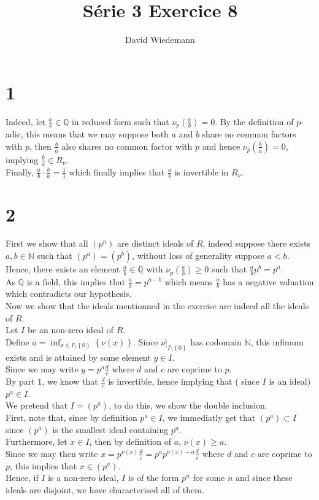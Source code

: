 \documentclass[11pt, a4paper]{article}
\begin{document}
\title{Série 3 Exercice 8}
\author{David Wiedemann}
\maketitle
\section*{1}
Indeed, let $\frac{a}{b}\in \mathbb{Q}$ in reduced form such that $\nu_p(\frac{a}{b} )=0 $. By the definition of $p$-adic, this means that we may suppose both $a$ and $b$ share no common factors with $p$, then $\frac{b}{a}$ also shares no common factor with $p$ and hence $\nu_p( \frac{b}{a}) =0$, implying $ \frac{b}{a}\in R_\nu$.\\
Finally, $\frac{a}{b}\cdot \frac{b}{a}= \frac{1}{1}$ which finally implies that $\frac{a}{b}$ is invertible in $R_\nu$.
\section*{2}
First we show that all $( p^{n}) $ are distinct ideals of $ R$, indeed suppose there exists $a,b \in \mathbb{N}$ such that $ ( p^{a}) = ( p^{b} )$, without loss of generality suppose $a<b$.\\
Hence, there exists an element $ \frac{a}{b} \in \mathbb{Q}$ with $ \nu_p( \frac{a}{b} ) \geq 0$ such that $ \frac{a}{b}p^{b} = p^{a} $.\\
As $ \mathbb{Q}$ is a field, this implies that $ \frac{a}{b}= p^{a-b}$ which means $ \frac{a}{b}$ has a negative valuation which contradicts our hypothesis.\\

Now we show that the ideals mentionned in the exercise are indeed all the ideals of $ R$.\\
Let $I$ be an non-zero ideal of $ R$.\\
Define $ a = \inf_{x \in I\setminus \left\{ 0 \right\} 	} \left\{ \nu( x)  \right\} $. Since $\nu\vert_{I \setminus \left\{ 0 \right\} }  $ has codomain $ \mathbb{N}$, this infimum exists and is attained by some element $y \in I$.\\
Since we may write $ y = p^{a} \frac{d}{c}$ where $d$ and $c$ are coprime to $p$.\\
By part $1$, we know that $\frac{d}{c}$ is invertible, hence implying that ( since $I$ is an ideal) $p^{a}\in I$.\\

We pretend that $ I = ( p^{a}) $, to do this, we show the double inclusion.\\
First, note that, since by definition $ p^{a}\in I$, we immediatly get that $ ( p^{a}) \subset I$ since $( p^{a}) $ is the smallest ideal containing $ p^{a}$.\\
Furthermore, let $x \in I$, then by definition of $a$, $\nu( x) \geq a$.\\
Since we may then write $x = p^{\nu( x) }\frac{d}{c} = p^{a} p^{\nu( x) -a}\frac{d}{c}$ where $d$ and $c$ are coprime to $p$, this implies that $x\in ( p^{a}) $.\\
Hence, if $I$ is a  non-zero ideal, $I$ is of the form $p^{n}$ for some $n$ and since these ideals are disjoint, we have characterised all of them.
\end{document}
